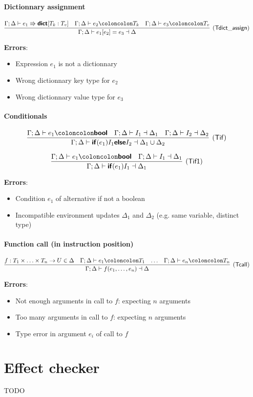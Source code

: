\documentclass[a4paper]{article}
\newcommand{\kw}[1]{\textsf{\textbf{#1}}}
\newcommand{\colcol}{\coloncolon}
\newcommand{\yield}{\Rrightarrow}
\newcommand{\fun}[1]{\mathsf{#1}}
\begin{document}
\paragraph{Dictionnary assignment}

$$
\infer[(\fun{Tdict\_assign})]{\Gamma;\Delta \vdash e_1[e_2] = e_3 \dashv \Delta}
{\Gamma;\Delta \vdash e_1 \yield \kw{dict}[T_k:T_v] & \Gamma;\Delta \vdash e_2 \colcol T_k & \Gamma;\Delta \vdash e_3 \colcol T_v}
$$

\textbf{Errors}:
\begin{itemize}
\item Expression $e_1$ is not a dictionnary
\item Wrong dictionnary key type for $e_2$
\item Wrong dictionnary value type for $e_3$
\end{itemize}

\paragraph{Conditionals}

$$
\infer[(\fun{Tif})]{\Gamma;\Delta \vdash \kw{if} (e_1) I_1 \kw{else} I_2 \dashv \Delta_1 \cup \Delta_2}
{\Gamma;\Delta \vdash e_1 \colcol \kw{bool} & \Gamma;\Delta \vdash I_1 \dashv \Delta_1 &  \Gamma;\Delta \vdash I_2 \dashv \Delta_2}
$$

$$
\infer[(\fun{Tif1})]{\Gamma;\Delta \vdash \kw{if} (e_1) I_1 \dashv \Delta_1}
{\Gamma;\Delta \vdash e_1 \colcol \kw{bool} & \Gamma;\Delta \vdash I_1 \dashv \Delta_1}
$$

\textbf{Errors}:
\begin{itemize}
\item Condition $e_1$ of alternative if not a boolean
\item Incompatible environment updates $\Delta_1$ and $\Delta_2$  (e.g. same variable, distinct type)
\end{itemize}

\paragraph{Function call (in instruction position)}

$$
\infer[(\fun{Tcall})]{\Gamma ; \Delta \vdash f(e_1,\ldots,e_n) \dashv \Delta}
{f:T_1\times \ldots \times T_n \rightarrow U \in \Delta & \Gamma;\Delta \vdash e_1 \colcol T_1 & \ldots &  \Gamma;\Delta \vdash e_n \colcol T_n}
$$

\textbf{Errors}:
\begin{itemize}
\item Not enough arguments in call to $f$: expecting $n$ arguments
\item Too many arguments in call to $f$: expecting $n$ arguments
\item Type error in argument $e_i$ of call to $f$
\end{itemize}

\section{Effect checker}

TODO
\end{document}
